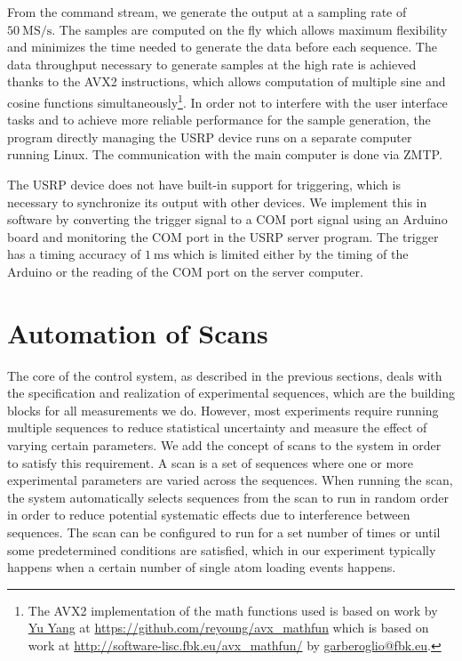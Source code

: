 From the command stream, we generate the output at a sampling rate of $50~\mathrm{MS/s}$.
The samples are computed on the fly which allows maximum flexibility
and minimizes the time needed to generate the data before each sequence.
The data throughput necessary to generate samples at the high rate is achieved
thanks to the AVX2 instructions,
which allows computation of multiple sine and cosine functions simultaneously\footnote{
  The AVX2 implementation of the math functions used is based on work by
  \href{https://github.com/reyoung}{Yu Yang} at \url{https://github.com/reyoung/avx_mathfun}
  which is based on work at \url{http://software-lisc.fbk.eu/avx_mathfun/}
  by \href{mailto:garberoglio@fbk.eu}{garberoglio@fbk.eu}.
}. In order not to interfere with the user interface tasks
and to achieve more reliable performance for the sample generation,
the program directly managing the USRP device runs on a separate computer running Linux.
The communication with the main computer is done via ZMTP.

The USRP device does not have built-in support for triggering,
which is necessary to synchronize its output with other devices.
We implement this in software by converting the trigger signal to a COM port signal
using an Arduino board and monitoring the COM port in the USRP server program.
The trigger has a timing accuracy of $1~\mathrm{ms}$
which is limited either by the timing of the Arduino or
the reading of the COM port on the server computer.

\section{Automation of Scans}
\label{ch:computer-control:scan}

The core of the control system, as described in the previous sections,
deals with the specification and realization of experimental sequences,
which are the building blocks for all measurements we do.
However, most experiments require running multiple sequences
to reduce statistical uncertainty and measure the effect of varying certain parameters.
We add the concept of scans to the system in order to satisfy this requirement.
A scan is a set of sequences where one or more experimental parameters are varied
across the sequences.
When running the scan, the system automatically selects sequences
from the scan to run in random order in order to reduce potential systematic effects
due to interference between sequences.
The scan can be configured to run for a set number of times
or until some predetermined conditions are satisfied,
which in our experiment typically happens
when a certain number of single atom loading events happens.

